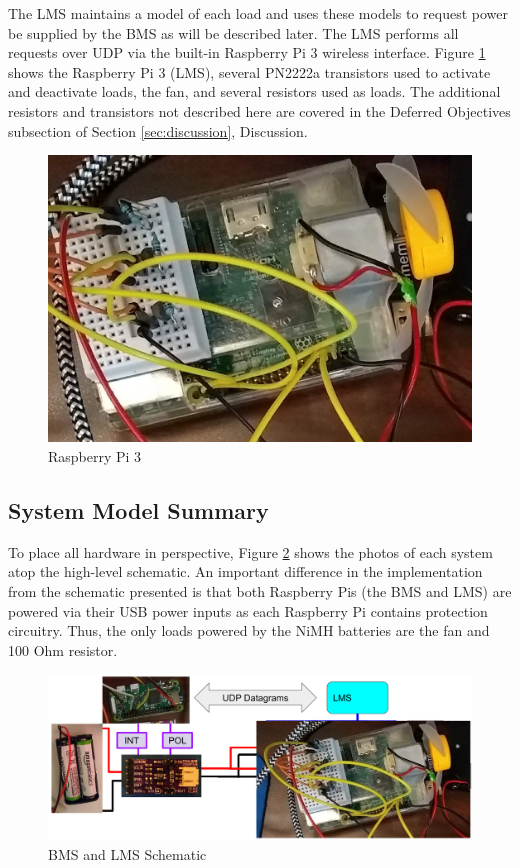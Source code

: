 \documentclass[11pt,conference,draftcls,onecolumn]{IEEEtran}
\begin{document}
The LMS maintains a model of each load and uses these models to request power be supplied by the BMS as will be described later.
The LMS performs all requests over UDP via the built-in Raspberry Pi 3 wireless interface.
Figure \ref{fig:rpi3} shows the Raspberry Pi 3 (LMS), several PN2222a transistors used to activate and deactivate loads, the fan, and several resistors used as loads. The additional resistors and transistors not described here are covered in the Deferred Objectives subsection of Section \ref{sec:discussion}, Discussion.
\begin{figure}[!htbp]
    \centering
    \includegraphics[width=6.5in]{img/rpi3.png}
    \caption{Raspberry Pi 3}
    \label{fig:rpi3}
\end{figure}

\subsection{System Model Summary}
To place all hardware in perspective, Figure \ref{fig:bmsModelPics} shows the photos of each system atop the high-level schematic.
An important difference in the implementation from the schematic presented is that both Raspberry Pis (the BMS and LMS) are powered via their USB power inputs as each Raspberry Pi contains protection circuitry.
Thus, the only loads powered by the NiMH batteries are the fan and 100 Ohm resistor.
\begin{figure}
    \centering
    \includegraphics[width=6.5in]{img/uBmsModelPics.png}
    \caption{BMS and LMS Schematic}
    \label{fig:bmsModelPics}
\end{figure}
\end{document}

